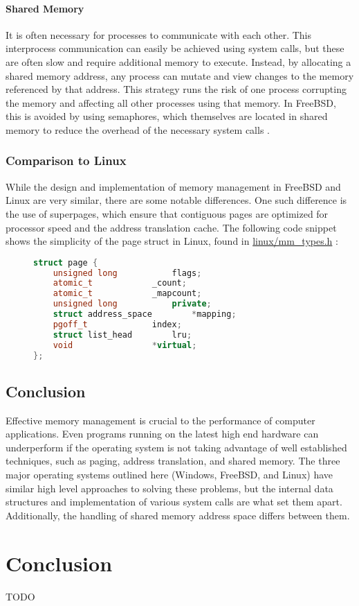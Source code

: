 \documentclass[letterpaper,draftclsnofoot,10pt,onecolumn,titlepage]{IEEEtran}\usepackage[margin=0.75in]{geometry}
\begin{document}
            \paragraph{Shared Memory}
            It is often necessary for processes to communicate with each other. This interprocess communication can 
            easily be achieved using system calls, but these are often slow and require additional memory to execute.
            Instead, by allocating a shared memory address, any process can mutate and view changes to the memory 
            referenced by that address. This strategy runs the risk of one process corrupting the memory and affecting
            all other processes using that memory. In FreeBSD, this is avoided by using semaphores, which themselves 
            are located in shared memory to reduce the overhead of the necessary system calls \cite{freebsd}.

        \subsubsection{Comparison to Linux}
        While the design and implementation of memory management in FreeBSD and Linux are very similar, there are 
        some notable differences. One such difference is the use of superpages, which ensure that contiguous pages 
        are optimized for processor speed and the address translation cache. The following code snippet shows the 
        simplicity of the page struct in Linux, found in \url{linux/mm_types.h} \cite{linux}:

\begin{figure}[H]
\begin{lstlisting}[language=C++]
struct page {
	unsigned long 			flags;
	atomic_t			_count;
	atomic_t			_mapcount;
	unsigned long			private;
	struct address_space		*mapping;
	pgoff_t				index;
	struct list_head		lru;
	void				*virtual;
};
\end{lstlisting}
\end{figure}

    \subsection{Conclusion}
    Effective memory management is crucial to the performance of computer applications. Even programs 
    running on the latest high end hardware can underperform if the operating system is not taking 
    advantage of well established techniques, such as paging, address translation, and shared memory.
    The three major operating systems outlined here (Windows, FreeBSD, and Linux) have similar high level
    approaches to solving these problems, but the internal data structures and implementation of various
    system calls are what set them apart. Additionally, the handling of shared memory address space differs
    between them.


\section{Conclusion}
TODO




\end{document}
